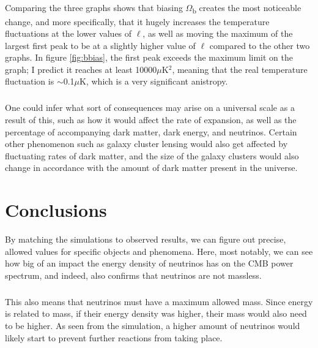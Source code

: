 \documentclass[twoside, fontsize=12pt,
     bibliography=totoc, %
     listof=totoc, %
     index=totoc, %
     onehalfspacing %
]{_MScDiss2017_cls}
\begin{document}
\paragraph{}

Comparing the three graphs shows that biasing $\Omega$\textsubscript{b} creates the most noticeable change, and more specifically, that it hugely increases the temperature fluctuations at the lower values of $\ell$, as well as moving the maximum of the largest first peak to be at a slightly higher value of $\ell$ compared to the other two graphs. In figure \ref{fig:bbias}, the first peak exceeds the maximum limit on the graph; I predict it reaches at least 10000$\mu$K$^2$, meaning that the real temperature fluctuation is $\sim$0.1$\mu$K, which is a very significant anistropy. 
\paragraph{}
One could infer what sort of consequences may arise on a universal scale as a result of this, such as how it would affect the rate of expansion, as well as the percentage of accompanying dark matter, dark energy, and neutrinos. Certain other phenomenon such as galaxy cluster lensing would also get affected by fluctuating rates of dark matter, and the size of the galaxy clusters would also change in accordance with the amount of dark matter present in the universe.




\chapter{Conclusions}

By matching the simulations to observed results, we can figure out precise, allowed values for specific objects and phenomena. Here, most notably, we can see how big of an impact the energy density of neutrinos has on the CMB power spectrum, and indeed, also confirms that neutrinos are not massless.

\paragraph{}

This also means that neutrinos must have a maximum allowed mass. Since energy is related to mass, if their energy density was higher, their mass would also need to be higher. As seen from the simulation, a higher amount of neutrinos would likely start to prevent further reactions from taking place.
\end{document}
